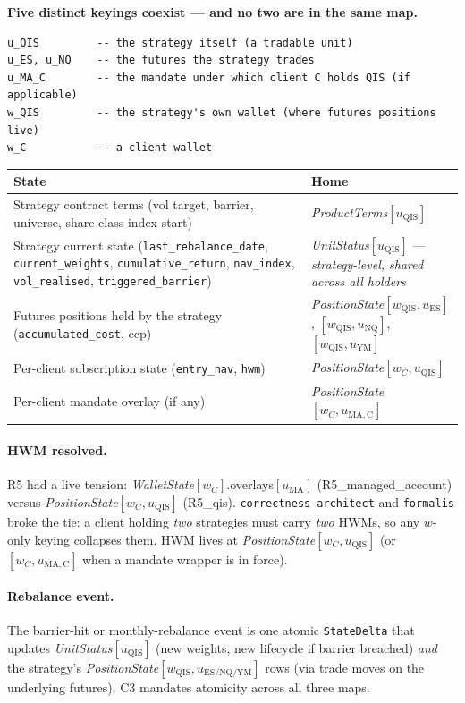 \documentclass[11pt,a4paper]{article}
\begin{document}
\textbf{Five distinct keyings coexist --- and no two are in the same map.}

\begin{lstlisting}
u_QIS         -- the strategy itself (a tradable unit)
u_ES, u_NQ    -- the futures the strategy trades
u_MA_C        -- the mandate under which client C holds QIS (if applicable)
w_QIS         -- the strategy's own wallet (where futures positions live)
w_C           -- a client wallet
\end{lstlisting}

\begin{longtable}{p{8.5cm}p{6.5cm}}
\toprule
\textbf{State} & \textbf{Home} \\
\midrule
Strategy contract terms (vol target, barrier, universe, share-class index start) & \textit{ProductTerms}$[u_{\mathrm{QIS}}]$ \\
Strategy current state (\texttt{last\_rebalance\_date}, \texttt{current\_weights}, \texttt{cumulative\_return}, \texttt{nav\_index}, \texttt{vol\_realised}, \texttt{triggered\_barrier}) & \textit{UnitStatus}$[u_{\mathrm{QIS}}]$ --- \emph{strategy-level, shared across all holders} \\
Futures positions held by the strategy (\texttt{accumulated\_cost}, ccp) & \textit{PositionState}$[w_{\mathrm{QIS}}, u_{\mathrm{ES}}]$, $[w_{\mathrm{QIS}}, u_{\mathrm{NQ}}]$, $[w_{\mathrm{QIS}}, u_{\mathrm{YM}}]$ \\
Per-client subscription state (\texttt{entry\_nav}, \texttt{hwm}) & \textit{PositionState}$[w_C, u_{\mathrm{QIS}}]$ \\
Per-client mandate overlay (if any) & \textit{PositionState}$[w_C, u_{\mathrm{MA,C}}]$ \\
\bottomrule
\end{longtable}

\paragraph{HWM resolved.} R5 had a live tension: \textit{WalletState}$[w_C]$.overlays$[u_{\mathrm{MA}}]$ (R5\_managed\_account) versus \textit{PositionState}$[w_C, u_{\mathrm{QIS}}]$ (R5\_qis). \texttt{correctness-architect} and \texttt{formalis} broke the tie: a client holding \emph{two} strategies must carry \emph{two} HWMs, so any $w$-only keying collapses them. HWM lives at \textit{PositionState}$[w_C, u_{\mathrm{QIS}}]$ (or $[w_C, u_{\mathrm{MA,C}}]$ when a mandate wrapper is in force).

\paragraph{Rebalance event.} The barrier-hit or monthly-rebalance event is one atomic \texttt{StateDelta} that updates \textit{UnitStatus}$[u_{\mathrm{QIS}}]$ (new weights, new lifecycle if barrier breached) \emph{and} the strategy's \textit{PositionState}$[w_{\mathrm{QIS}}, u_{\mathrm{ES/NQ/YM}}]$ rows (via trade moves on the underlying futures). C3 mandates atomicity across all three maps.
\end{document}
